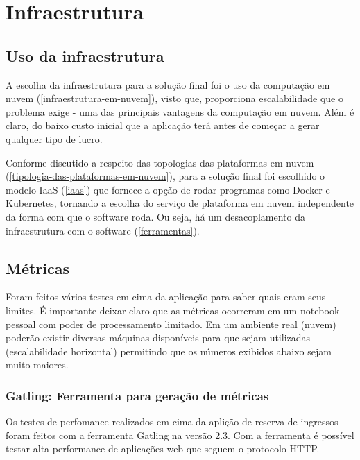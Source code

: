 \chapter{Infraestrutura}

\section{Uso da infraestrutura}

A escolha da infraestrutura para a solução final foi o uso da
computação em nuvem (\autoref{infraestrutura-em-nuvem}), visto que, proporciona
escalabilidade que o problema exige - uma das principais vantagens da computação em nuvem.
Além é claro, do baixo custo inicial que a aplicação terá antes de começar a gerar qualquer
tipo de lucro.

Conforme discutido a respeito das topologias das plataformas em
nuvem (\autoref{tipologia-das-plataformas-em-nuvem}), para a solução final foi escolhido o
modelo IaaS (\autoref{iaas}) que fornece a opção de rodar programas como Docker e
Kubernetes, tornando a escolha do serviço de plataforma em nuvem independente da forma
com que o software roda. Ou seja, há um desacoplamento da infraestrutura com o software
(\autoref{ferramentas}).

\section{Métricas}

Foram feitos vários testes em cima da aplicação para saber quais eram seus limites.
É importante deixar claro que as métricas ocorreram em um notebook pessoal com poder
de processamento limitado. Em um ambiente real (nuvem) poderão existir diversas máquinas
disponíveis para que sejam utilizadas (escalabilidade horizontal) permitindo que os
números exibidos abaixo sejam muito maiores.

\subsection{Gatling: Ferramenta para geração de métricas}

Os testes de perfomance realizados em cima da aplição de reserva de ingressos foram
feitos com a ferramenta Gatling na versão 2.3.
Com a ferramenta é possível testar alta performance de aplicações web
\cite{gatling-docs} que seguem o protocolo HTTP.

